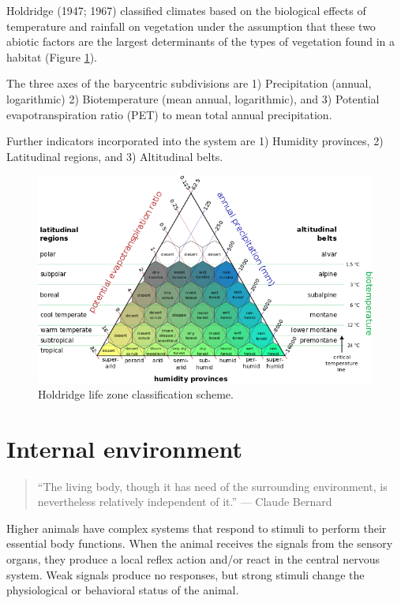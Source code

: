 \documentclass[]{book}
\begin{document}
Holdridge (1947; 1967) classified climates based on the biological effects of temperature and rainfall on vegetation under the assumption that these two abiotic factors are the largest determinants of the types of vegetation found in a habitat (Figure \ref{fig:holdridge}).

The three axes of the barycentric subdivisions are 1) Precipitation (annual, logarithmic) 2) Biotemperature (mean annual, logarithmic), and 3) Potential evapotranspiration ratio (PET) to mean total annual precipitation.

Further indicators incorporated into the system are 1) Humidity provinces, 2) Latitudinal regions, and 3) Altitudinal belts.

\begin{figure}

\includegraphics[width=0.65\linewidth]{figures/lifezones} \hfill{}

\caption{Holdridge life zone classification scheme.}\label{fig:holdridge}
\end{figure}

\hypertarget{internal-environment}{%
\section{Internal environment}\label{internal-environment}}

\begin{quote}
``The living body, though it has need of the surrounding environment, is nevertheless relatively independent of it.'' --- Claude Bernard
\end{quote}

Higher animals have complex systems that respond to stimuli to perform their essential body functions. When the animal receives the signals from the sensory organs, they produce a local reflex action and/or react in the central nervous system. Weak signals produce no responses, but strong stimuli change the physiological or behavioral status of the animal.
\end{document}
